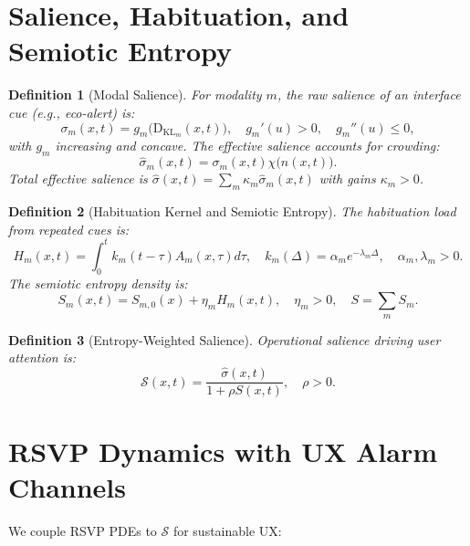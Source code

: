 \documentclass[openany]{book}
\newtheorem{definition}{Definition}[chapter]
\newcommand{\Sent}{S} %
\newcommand{\KL}{\mathrm{D}_{\mathrm{KL}}}
\begin{document}
\section{Salience, Habituation, and Semiotic Entropy}
\label{sec:rsvp-salience}
\begin{definition}[Modal Salience]
\label{def:salience}
For modality $m$, the \emph{raw salience} of an interface cue (e.g., eco-alert) is:
\begin{equation}
\label{eq:raw-salience}
\sigma_m(x,t) = g_m\big(\KL_m(x,t)\big), \quad g_m'(u) > 0, \quad g_m''(u) \leq 0,
\end{equation}
with $g_m$ increasing and concave. The \emph{effective salience} accounts for crowding:
\begin{equation}
\label{eq:eff-salience}
\widehat{\sigma}_m(x,t) = \sigma_m(x,t) \chi\big(n(x,t)\big).
\end{equation}
Total effective salience is $\widehat{\sigma}(x,t) = \sum_m \kappa_m \widehat{\sigma}_m(x,t)$ with gains $\kappa_m > 0$.
\end{definition}

\begin{definition}[Habituation Kernel and Semiotic Entropy]
\label{def:habituation}
The \emph{habituation load} from repeated cues is:
\begin{equation}
\label{eq:habituation}
H_m(x,t) = \int_{0}^{t} k_m(t-\tau) A_m(x,\tau) d\tau, \quad k_m(\Delta) = \alpha_m e^{-\lambda_m \Delta}, \quad \alpha_m, \lambda_m > 0.
\end{equation}
The \emph{semiotic entropy density} is:
\begin{equation}
\label{eq:semiotic-entropy}
\Sent_m(x,t) = S_{m,0}(x) + \eta_m H_m(x,t), \quad \eta_m > 0, \quad \Sent = \sum_m \Sent_m.
\end{equation}
\end{definition}

\begin{definition}[Entropy-Weighted Salience]
\label{def:entropy-weighted-salience}
Operational salience driving user attention is:
\begin{equation}
\label{eq:entropy-suppress}
\mathcal{S}(x,t) = \frac{\widehat{\sigma}(x,t)}{1 + \rho \Sent(x,t)}, \quad \rho > 0.
\end{equation}
\end{definition}

\section{RSVP Dynamics with UX Alarm Channels}
\label{sec:rsvp-dynamics}
We couple RSVP PDEs to $\mathcal{S}$ for sustainable UX:
\end{document}

